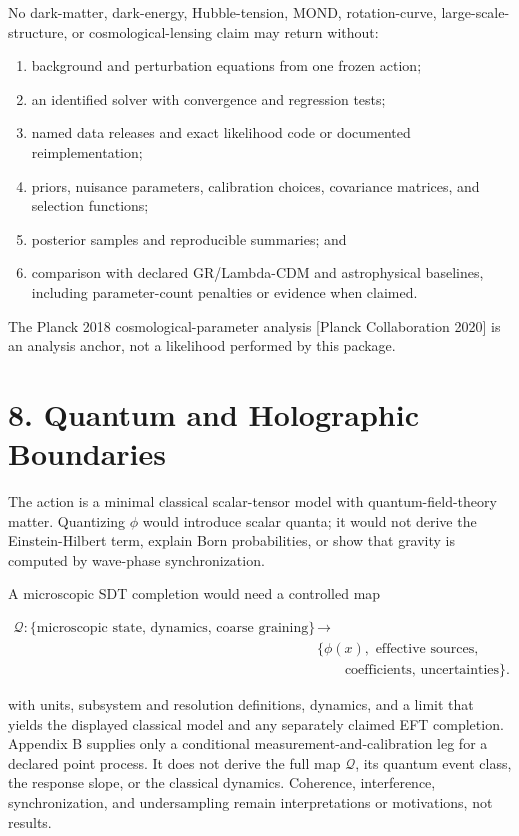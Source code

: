 \documentclass[
  american,
  11pt,
  letterpaper,
]{article}
\providecommand{\tightlist}{%
  \setlength{\itemsep}{0pt}\setlength{\parskip}{0pt}}
\begin{document}
No dark-matter, dark-energy, Hubble-tension, MOND, rotation-curve, large-scale-structure, or cosmological-lensing claim may return without:

\begin{enumerate}
\def\labelenumi{\arabic{enumi}.}
\tightlist
\item
  background and perturbation equations from one frozen action;
\item
  an identified solver with convergence and regression tests;
\item
  named data releases and exact likelihood code or documented reimplementation;
\item
  priors, nuisance parameters, calibration choices, covariance matrices, and selection functions;
\item
  posterior samples and reproducible summaries; and
\item
  comparison with declared GR/Lambda-CDM and astrophysical baselines, including parameter-count penalties or evidence when claimed.
\end{enumerate}

The Planck 2018 cosmological-parameter analysis {[}Planck Collaboration 2020{]} is an analysis anchor, not a likelihood performed by this package.

\section{8. Quantum and Holographic Boundaries}\label{quantum-and-holographic-boundaries}

The action is a minimal classical scalar-tensor model with quantum-field-theory matter. Quantizing \(\phi\) would introduce scalar quanta; it would not derive the Einstein-Hilbert term, explain Born probabilities, or show that gravity is computed by wave-phase synchronization.

A microscopic SDT completion would need a controlled map

\[
\begin{aligned}
\mathcal Q:\{\text{microscopic state, dynamics, coarse graining}\}
&\longrightarrow\\
&\{\phi(x),\text{ effective sources,}\\
&\qquad\text{coefficients, uncertainties}\}.
\end{aligned}
\tag{26}
\]

with units, subsystem and resolution definitions, dynamics, and a limit that yields the displayed classical model and any separately claimed EFT completion. Appendix B supplies only a conditional measurement-and-calibration leg for a declared point process. It does not derive the full map \(\mathcal Q\), its quantum event class, the response slope, or the classical dynamics. Coherence, interference, synchronization, and undersampling remain interpretations or motivations, not results.
\end{document}

